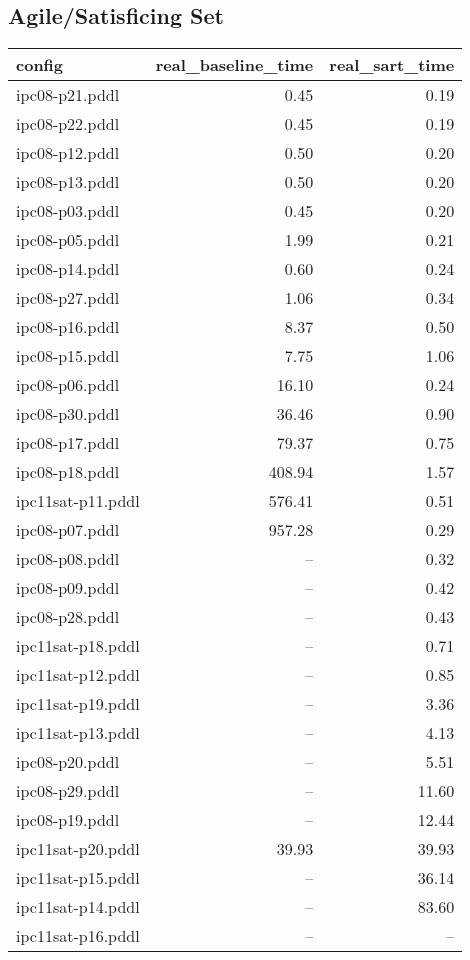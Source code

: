\documentclass{article}
\begin{document}
                    \subsection*{Agile/Satisficing Set}
                    
                            \begin{center}
                            \scriptsize
                            \begin{tabular}{@{}l|r|r@{}}
                            config & real\_baseline\_time & real\_sart\_time\\\midrule
                             ipc08-p21.pddl&0.45&0.19\\
 ipc08-p22.pddl&0.45&0.19\\
 ipc08-p12.pddl&0.50&0.20\\
 ipc08-p13.pddl&0.50&0.20\\
 ipc08-p03.pddl&0.45&0.20\\
 ipc08-p05.pddl&1.99&0.21\\
 ipc08-p14.pddl&0.60&0.24\\
 ipc08-p27.pddl&1.06&0.34\\
 ipc08-p16.pddl&8.37&0.50\\
 ipc08-p15.pddl&7.75&1.06\\
 ipc08-p06.pddl&16.10&0.24\\
 ipc08-p30.pddl&36.46&0.90\\
 ipc08-p17.pddl&79.37&0.75\\
 ipc08-p18.pddl&408.94&1.57\\
 ipc11sat-p11.pddl&576.41&0.51\\
 ipc08-p07.pddl&957.28&0.29\\
 ipc08-p08.pddl&--&0.32\\
 ipc08-p09.pddl&--&0.42\\
 ipc08-p28.pddl&--&0.43\\
 ipc11sat-p18.pddl&--&0.71\\
 ipc11sat-p12.pddl&--&0.85\\
 ipc11sat-p19.pddl&--&3.36\\
 ipc11sat-p13.pddl&--&4.13\\
 ipc08-p20.pddl&--&5.51\\
 ipc08-p29.pddl&--&11.60\\
 ipc08-p19.pddl&--&12.44\\
 ipc11sat-p20.pddl&39.93&39.93\\
 ipc11sat-p15.pddl&--&36.14\\
 ipc11sat-p14.pddl&--&83.60\\
 ipc11sat-p16.pddl&--&--
                            \end{tabular}
                            \end{center}
                    
\end{document}
